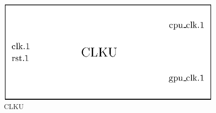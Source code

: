 \begin{figure}[H]
    \centering
    \includegraphics[scale=1.0]{Chapter4-GPU_CLKU/res/clku}
    \caption{CLKU}
    \label{fig:clku/clku}
\end{figure}